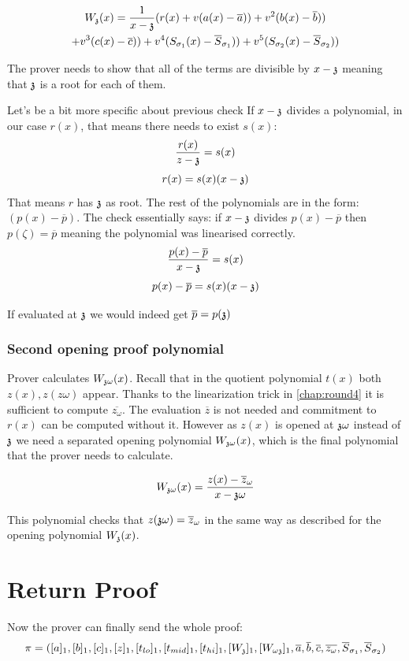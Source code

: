 \begin{multline}
    W_{\mathfrak{z}}(x) = \frac{1}{x - \mathfrak{z}} (
        r(x) 
        + v(a(x) - \overline{a})) 
        + v^2(b(x) - \overline{b})) \\
        + v^3(c(x) - \overline{c})) 
        + v^4(S_{\sigma_1}(x) - \overline{S}_{\sigma_1})) 
        + v^5(S_{\sigma_2}(x) - \overline{S}_{\sigma_2})) 
\end{multline}

The prover needs to show that all of the terms are divisible by $x - \mathfrak{z}$ meaning that $\mathfrak{z}$ is a root for each of them.

Let's be a bit more specific about previous check
If $x - \mathfrak{z}$ divides a polynomial, in our case $r(x)$, that means there needs to exist $s(x)$:
$$\frac{r(x)}{z-\mathfrak{z}} = s(x)$$
$$r(x)= s(x)(x-\mathfrak{z})$$
That means $r$ has $\mathfrak{z}$ as root. The rest of the polynomials are in the form: $(p(x) - \overline{p})$. The check essentially says: if $x - \mathfrak{z}$ divides $p(x) - \overline{p}$ then $p(\zeta) = \overline{p}$ meaning the polynomial was linearised correctly.
$$\frac{p(x) - \overline{p}}{x-\mathfrak{z}} = s(x)$$
$$p(x) - \overline{p}= s(x)(x-\mathfrak{z})$$

If evaluated at $\mathfrak{z}$ we would indeed get $\overline{p} = p(\mathfrak{z})$


\subsubsection{Second opening proof polynomial}
Prover calculates $W_{\mathfrak{z}\omega}(x)$. Recall that in the quotient polynomial $t(x)$ both $z(x), z(z\omega)$ appear. Thanks to the linearization trick in \eqref{chap:round4} it is sufficient to compute $\overline{z_\omega}$. The evaluation $\overline{z}$ is not needed and commitment to $r(x)$ can be computed without it. However as $z(x)$ is opened at $\mathfrak{z}\omega$ instead of $\mathfrak{z}$ we need a separated opening polynomial $W_{\mathfrak{z}\omega}(x)$, which is the final polynomial that the prover needs to calculate.

$$W_{\mathfrak{z}\omega}(x) = \frac{z(x)-\overline{z}_{\omega}}{x - \mathfrak{z}\omega}$$

This polynomial checks that $z(\mathfrak{z}\omega) = \overline{z}_\omega$ in the same way as described for the opening polynomial $W_{\mathfrak{z}}(x)$.



\section{Return Proof}
Now the prover can finally send the whole proof:
$$\pi = ([a]_1, [b]_1, [c]_1, [z]_1, [t_{lo}]_1, [t_{mid}]_1, [t_{hi}]_1, [W_{\mathfrak{z}}]_1, [W_{\omega\mathfrak{z}}]_1, \overline{a}, \overline{b}, \overline{c}, \overline{z_\omega}, \overline{S}_{\sigma_1}, \overline{S}_{\sigma_2})$$





